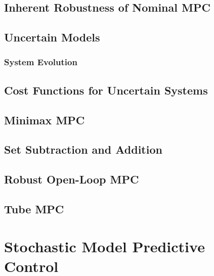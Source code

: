 
    \section{Inherent Robustness of Nominal MPC} %

    \section{Uncertain Models} %

        \subsection{System Evolution} %

    \section{Cost Functions for Uncertain Systems} %

    \section{Minimax MPC} %

    \section{Set Subtraction and Addition} %

    \section{Robust Open-Loop MPC} %

    \section{Tube MPC} %

\chapter{Stochastic Model Predictive Control} %
	\label{c:mpcStochastic}

